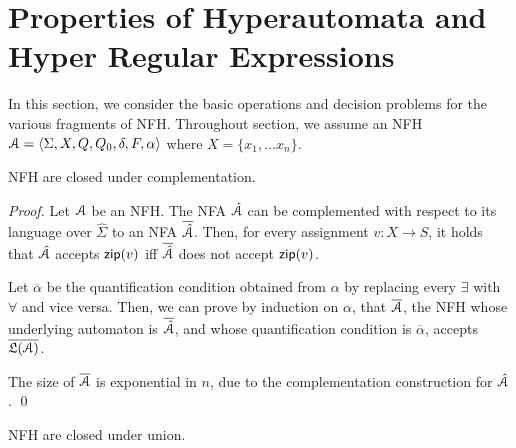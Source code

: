 \section{Properties of Hyperautomata and Hyper Regular Expressions}
\label{sec:nfh_properties}


In this section, we consider the basic operations and decision problems for the various fragments of NFH. 
Throughout  section, we assume an NFH $\mathcal{A} = \langle \Sigma,X,Q,Q_0,\delta,F,\alpha \rangle$ where $X = \{x_1,\ldots x_n\}$. 


\begin{theorem} \label{thm:nfh.complement}
NFH are closed under complementation.
\end{theorem}

\begin{proof}
Let $\mathcal{A}$ be an NFH. The NFA $\hat {\mathcal{A}}$ 
can be complemented with respect to its language over $\hat\Sigma$ to an NFA $\overline{\hat{\mathcal{A}}}$. 
Then, for every assignment $v:X\rightarrow S$, it holds that $\hat {\mathcal{A}}$ accepts 
$\mathsf{zip}(v)$ iff $\overline{\hat{\mathcal{A}}}$ does not accept $\mathsf{zip}(v)$.

Let $\overline{\alpha}$ be the quantification condition obtained from $\alpha$ by 
replacing every $\exists$ with $\forall$ and vice versa. 
Then, we can prove by induction on $\alpha$, that $\overline{\mathcal{A}}$, the NFH whose 
underlying automaton is $\overline{\hat{\mathcal{A}}}$, and whose quantification condition is 
$\overline{\alpha}$, accepts $\overline {\mathfrak{L}(\mathcal{A})}$.

The size of $\overline{\mathcal{A}}$ is exponential in $n$, due to the complementation construction for $\hat{\mathcal{A}}$.
\qed
\end{proof}


\begin{theorem} \label{thm:nfh.union}
NFH are closed under union.
\end{theorem}

